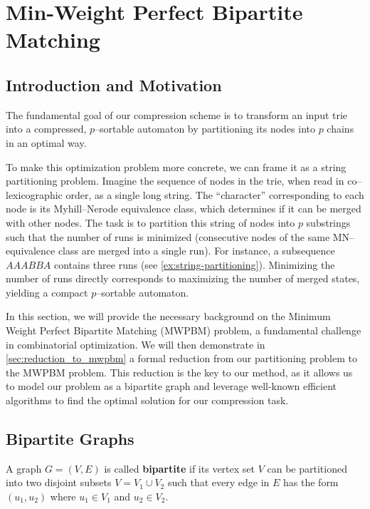 \section{Min-Weight Perfect Bipartite Matching} \label{chp:min_weight_perfect_bipartite_matching}

\subsection{Introduction and Motivation}
The fundamental goal of our compression scheme is to transform an input trie into a compressed, $p$--sortable automaton by partitioning its nodes into $p$ chains in an optimal way.

To make this optimization problem more concrete, we can frame it as a string partitioning problem. Imagine the sequence of nodes in the trie, when read in co--lexicographic order, as a single long string. The ``character'' corresponding to each node is its Myhill--Nerode equivalence class, which determines if it can be merged with other nodes. The task is to partition this string of nodes into $p$ substrings such that the number of runs is minimized (consecutive nodes of the same MN--equivalence class are merged into a single run). For instance, a subsequence $AAABBA$ contains three runs (see \cref{ex:string-partitioning}). Minimizing the number of runs directly corresponds to maximizing the number of merged states, yielding a compact $p$--sortable automaton.

In this section, we will provide the necessary background on the Minimum Weight Perfect Bipartite Matching (MWPBM) problem, a fundamental challenge in combinatorial optimization. We will then demonstrate in \cref{sec:reduction_to_mwpbm} a formal reduction from our partitioning problem to the MWPBM problem. This reduction is the key to our method, as it allows us to model our problem as a bipartite graph and leverage well-known efficient algorithms to find the optimal solution for our compression task.

\subsection{Bipartite Graphs} 
\begin{definition} \label{def:bipartite}
    A graph $G=(V,E)$ is called \textbf{bipartite} if its vertex set $V$ can be partitioned into two disjoint subsets $V=V_1 \cup V_2$ such that every edge in $E$ has the form $(u_1,u_2)$ where $u_1\in V_1$ and $u_2 \in V_2$.
\end{definition} 

